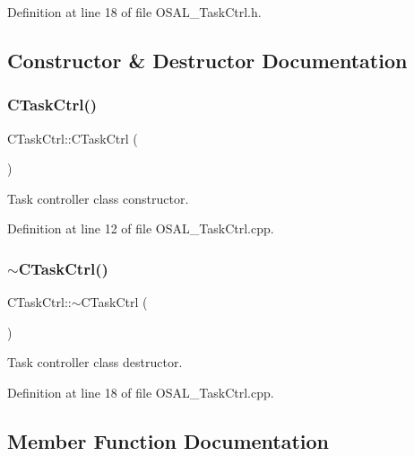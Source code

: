 Definition at line 18 of file O\+S\+A\+L\+\_\+\+Task\+Ctrl.\+h.



\subsection{Constructor \& Destructor Documentation}
\mbox{\label{class_c_task_ctrl_a4d459479b49c5d6e1d07e9306748abe3}} 
\subsubsection{\texorpdfstring{CTaskCtrl()}{CTaskCtrl()}}
{\footnotesize\ttfamily C\+Task\+Ctrl\+::\+C\+Task\+Ctrl (\begin{DoxyParamCaption}{ }\end{DoxyParamCaption})}



Task controller class constructor. 



Definition at line 12 of file O\+S\+A\+L\+\_\+\+Task\+Ctrl.\+cpp.

\mbox{\label{class_c_task_ctrl_a525a2b4438270d4ea5fce41e646c5b17}} 
\subsubsection{\texorpdfstring{$\sim$CTaskCtrl()}{~CTaskCtrl()}}
{\footnotesize\ttfamily C\+Task\+Ctrl\+::$\sim$\+C\+Task\+Ctrl (\begin{DoxyParamCaption}{ }\end{DoxyParamCaption})}



Task controller class destructor. 



Definition at line 18 of file O\+S\+A\+L\+\_\+\+Task\+Ctrl.\+cpp.



\subsection{Member Function Documentation}
\mbox{\label{class_c_task_ctrl_a12ec6e8d4a490eba9ebdf22d32cf292b}} 
